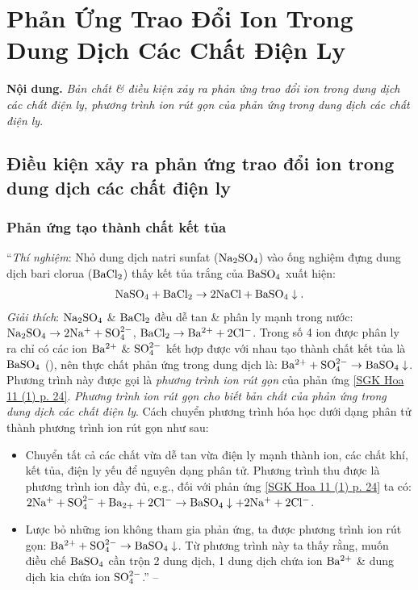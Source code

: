 \documentclass[oneside]{book}
\numberwithin{equation}{section}
\begin{document}

\section{Phản Ứng Trao Đổi Ion Trong Dung Dịch Các Chất Điện Ly}
\textbf{Nội dung.} \textit{Bản chất \& điều kiện xảy ra phản ứng trao đổi ion trong dung dịch các chất điện ly, phương trình ion rút gọn của phản ứng trong dung dịch các chất điện ly}.

\subsection{Điều kiện xảy ra phản ứng trao đổi ion trong dung dịch các chất điện ly}

\subsubsection{Phản ứng tạo thành chất kết tủa}
``\textit{Thí nghiệm}: Nhỏ dung dịch natri sunfat ($\rm Na_2SO_4$) vào ống nghiệm đựng dung dịch bari clorua ($\rm BaCl_2$) thấy kết tủa trắng của $\rm BaSO_4$ xuất hiện:
\begin{align}
	\label{SGK Hoa 11 (1) p. 24}
	\rm NaSO_4 + BaCl_2\to 2NaCl + BaSO_4\downarrow.
\end{align}
\textit{Giải thích}: $\rm Na_2SO_4$ \& $\rm BaCl_2$ đều dễ tan \& phân ly mạnh trong nước: $\rm Na_2SO_4\to 2Na^+ + SO_4^{2-}$, $\rm BaCl_2\to Ba^{2+} + 2Cl^-$. Trong số 4 ion được phân ly ra chỉ có các ion $\rm Ba^{2+}$ \& $\rm SO_4^{2-}$ kết hợp được với nhau tạo thành chất kết tủa là $\rm BaSO_4$ (\cite[Hình 1.6: \textsf{Chất kết tủa $\rm BaSO_4$}, p. 24]{SGK_Hoa_Hoc_11_nang_cao}), nên thực chất phản ứng trong dung dịch là: $\rm Ba^{2+} + SO_4^{2-}\to BaSO_4\downarrow$. Phương trình này được gọi là \textit{phương trình ion rút gọn} của phản ứng \eqref{SGK Hoa 11 (1) p. 24}. \textit{Phương trình ion rút gọn cho biết bản chất của phản ứng trong dung dịch các chất điện ly}. Cách chuyển phương trình hóa học dưới dạng phân tử thành phương trình ion rút gọn như sau:
\begin{itemize}
	\item Chuyển tất cả các chất vừa dễ tan vừa điện ly mạnh thành ion, các chất khí, kết tủa, điện ly yếu để nguyên dạng phân tử. Phương trình thu được là phương trình ion đầy đủ, e.g., đối với phản ứng \eqref{SGK Hoa 11 (1) p. 24} ta có: $\rm 2Na^+ + SO_4^{2-} + Ba_{2+} + 2Cl^-\to BaSO_4\downarrow + 2Na^+ + 2Cl^-$.
	\item Lược bỏ những ion không tham gia phản ứng, ta được phương trình ion rút gọn: $\rm Ba^{2+} + SO_4^{2-}\to BaSO_4\downarrow$. Từ phương trình này ta thấy rằng, muốn điều chế $\rm BaSO_4$ cần trộn 2 dung dịch, 1 dung dịch chứa ion $\rm Ba^{2+}$ \& dung dịch kia chứa ion $\rm SO_4^{2-}$.'' -- \cite[pp. 24--25]{SGK_Hoa_Hoc_11_nang_cao}
\end{itemize}
\end{document}
